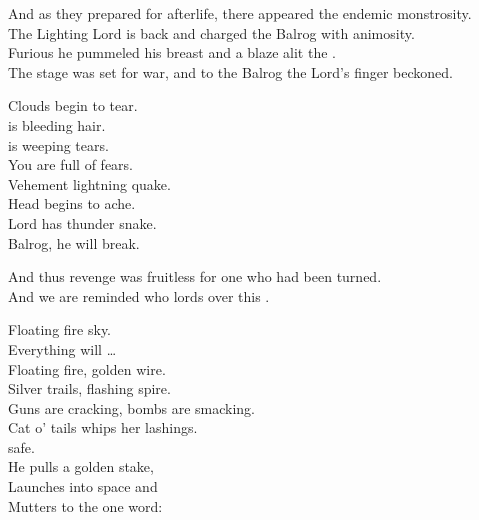 And as they prepared for afterlife, there appeared the endemic monstrosity. \\
The Lighting Lord is back and charged the Balrog with animosity. \\

Furious he pummeled his breast and a blaze alit the . \\
The stage was set for war, and to the Balrog the Lord's finger beckoned. \\





Clouds begin to tear. \\
 is bleeding hair. \\
 is weeping tears. \\
You are full of fears. \\

Vehement lightning quake. \\
Head begins to ache. \\
Lord has thunder snake. \\
Balrog, he will break. \\


And thus revenge was fruitless for one who had been turned. \\
And we are reminded who lords over this . \\


Floating fire sky. \\
Everything will … \\

Floating fire, golden wire. \\
Silver trails, flashing spire. \\
Guns are cracking, bombs are smacking. \\
Cat o' tails whips her lashings. \\

 safe. \\
He pulls a golden stake, \\
Launches into space and \\
Mutters to the  one word: \\

